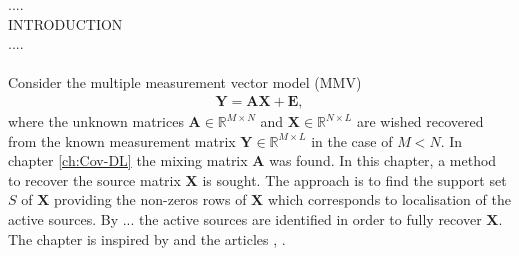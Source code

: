 ....\\
INTRODUCTION\\
....\\
\\ 
Consider the multiple measurement vector model (MMV)
\begin{align*}
\mathbf{Y} = \mathbf{AX} + \mathbf{E},
\end{align*}
where the unknown matrices $\mathbf{A} \in \mathbb{R}^{M \times N}$ and $\mathbf{X} \in \mathbb{R}^{N \times L}$ are wished recovered from the known measurement matrix $\mathbf{Y} \in \mathbb{R}^{M \times L}$ in the case of $M < N$. In chapter \ref{ch:Cov-DL} the mixing matrix $\mathbf{A}$ was found. In this chapter, a method to recover the source matrix $\mathbf{X}$ is sought. The approach is to find the support set $S$ of $\textbf{X}$ providing the non-zeros rows of $\mathbf{X}$ which corresponds to localisation of the active sources. By ... the active sources are identified in order to fully recover $\textbf{X}$.
\\
The chapter is inspired by \cite{phd_wipf} and the articles \cite{article_wipf}, \cite{Balkan2014}.

